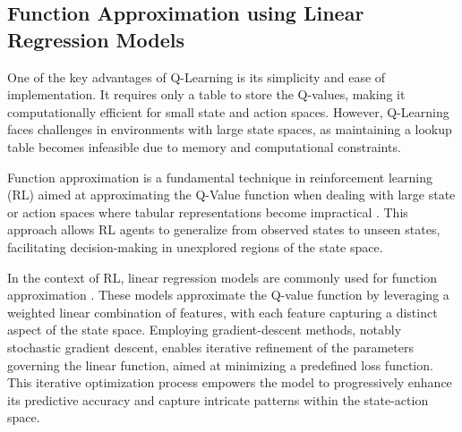 

\subsection{Function Approximation using Linear Regression Models}

One of the key advantages of Q-Learning is its simplicity and ease of implementation. It requires only a table to store the Q-values, making it computationally efficient for small state and action spaces. However, Q-Learning faces challenges in environments with large state spaces, as maintaining a lookup table becomes infeasible due to memory and computational constraints.

Function approximation is a fundamental technique in reinforcement learning (RL) aimed at approximating the Q-Value function when dealing with large state or action spaces where tabular representations become impractical \cite{russel2020ai}. This approach allows RL agents to generalize from observed states to unseen states, facilitating decision-making in unexplored regions of the state space.

In the context of RL, linear regression models are commonly used for function approximation \cite{sutton2018reinforcement}.  These models approximate the Q-value function by leveraging a weighted linear combination of features, with each feature capturing a distinct aspect of the state space. Employing gradient-descent methods, notably stochastic gradient descent, enables iterative refinement of the parameters governing the linear function, aimed at minimizing a predefined loss function. This iterative optimization process empowers the model to progressively enhance its predictive accuracy and capture intricate patterns within the state-action space.

